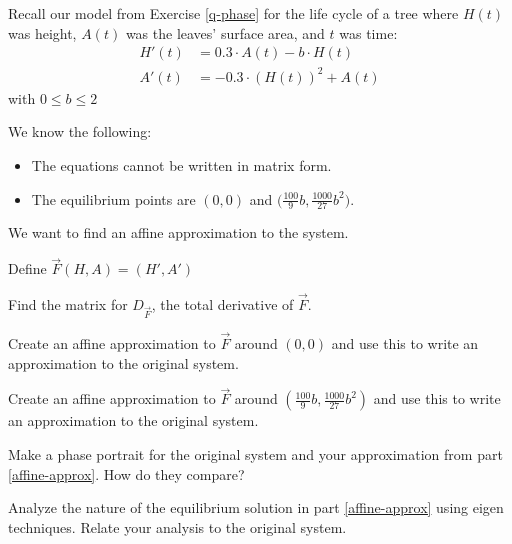 \documentclass{workbook}
\begin{document}
\begin{slide}

	Recall our model from Exercise \ref{q-phase} for the life cycle of a tree where $H(t)$ was
	height, $A(t)$ was the leaves' surface area, and $t$ was time:
	\begin{align*}
		H'(t) &= 0.3\cdot A(t)-b\cdot H(t)\\
		A'(t) &= -0.3\cdot (H(t))^2 + A(t)
	\end{align*}
	with $0 \leq b \leq 2$

	\bigskip
	
	We know the following:
	\begin{itemize}
		\item The equations cannot be written in matrix form.
		\item The equilibrium points are $(0,0)$ and $\Big(\frac{100}{9}b,\frac{1000}{27}b^2\Big)$.			
	\end{itemize}	

	We want to find an affine approximation to the system.

	Define $\vec F(H,A)=(H', A')$
	\begin{parts}
		\item Find the matrix for $D_{\vec F}$, the total derivative of $\vec F$.
		\item Create an affine approximation to $\vec F$ around $(0,0)$ and use this to write an approximation to the original system.
		\item\label{affine-approx}
		 Create an affine approximation to $\vec F$ around $(\frac{100}{9}b,\frac{1000}{27}b^2)$ and use this to write an approximation to the original system.
		
		\bigskip 
		\item Make a phase portrait for the original system and your approximation from part \ref{affine-approx}. How do they compare?
		\item Analyze the nature of the equilibrium solution in part \ref{affine-approx} using eigen techniques. Relate your analysis to
		the original system.

	\end{parts}
\end{slide}

%
%
\end{document}

